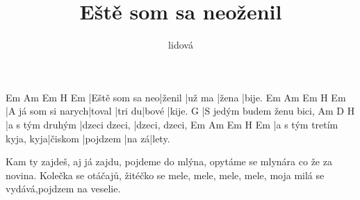 \documentclass{song}
\title{Eště som sa neoženil}
\author{lidová}
\begin{document}
\strophe
Em              Am     Em     H\7   Em
|Eště som sa neo|ženil |už ma |žena |bije.
Em                 Am     Em     H\7   Em
|A já som si narych|toval |tri du|bové |kije.
G
|S jedým budem ženu bici,
Am              D             H\7
|a s tým druhým |dzeci dzeci, |dzeci, dzeci,
Em                        Am      Em       H\7   Em
|a s tým tretím kyja, kyja|čiskom |pojdzem |na zá|lety.
\endstrophe

\strophe*
Kam ty zajdeš, aj já zajdu, pojdeme do mlýna,
opytáme se mlynára co že za novina.
Kolečka se otáčajů,
žitéčko se mele, mele, mele, mele,
moja milá se vydává,pojdzem na veselie.
\endstrophe
\end{document}
